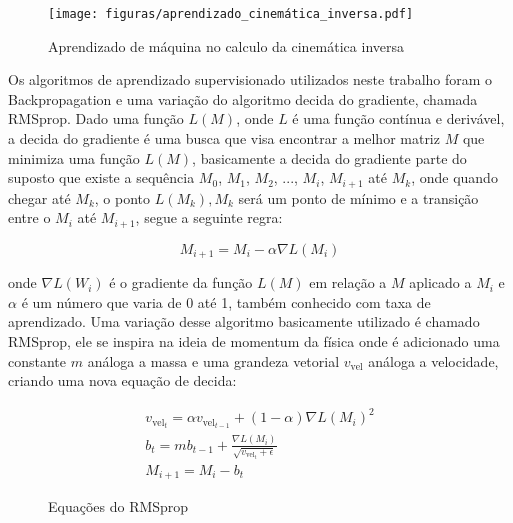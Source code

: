 \begin{figure}[H]
    \centering
    \texttt{[image: figuras/aprendizado\_cinemática\_inversa.pdf]}
    \caption{Aprendizado de máquina no calculo da cinemática inversa}
\end{figure}

Os algoritmos de aprendizado supervisionado utilizados neste trabalho
foram o Backpropagation e uma variação do algoritmo decida do gradiente, chamada
RMSprop.
Dado uma função $L(M)$, onde $L$ é uma função contínua e derivável,
a decida do gradiente é uma busca que visa encontrar
a melhor matriz $M$ que minimiza uma função $L(M)$, basicamente a
decida do gradiente parte do suposto que existe a sequência
$M_0$, $M_1$, $M_2$, ..., $M_i$, $M_{i+1}$ até $M_k$, onde quando
chegar até $M_k$, o ponto $L(M_k),M_k$ será um ponto de mínimo e a transição
entre o $M_{i}$ até $M_{i+1}$, segue a seguinte regra:

\begin{equation}
    M_{i+1} = M_i -\alpha \nabla L(M_i)
\end{equation}

onde $\nabla L(W_i)$ é o gradiente da função $L(M)$ em relação a $M$ aplicado
a $M_i$ e $\alpha$ é um número que varia de 0 até 1,
também conhecido com taxa de aprendizado. Uma variação desse algoritmo
basicamente utilizado é chamado RMSprop, ele se inspira na ideia de momentum
da física  onde  é adicionado uma constante $m$ análoga a massa e uma grandeza
vetorial $v_{\text{vel}}$ análoga a velocidade, criando uma nova equação de decida:

\begin{figure}[H]
    \begin{align*}
        v_{\text{vel}_t} = \alpha v_{\text{vel}_{t-1}} + (1 - \alpha)\nabla L(M_i)^2 \\
        b_t = mb_{t-1} + \frac{\nabla L(M_i)}{\sqrt{v_{\text{vel}_t} + \epsilon}} \\
        M_{i+1} = M_i - b_t
    \end{align*}
    \caption{Equações do RMSprop}
\end{figure}

